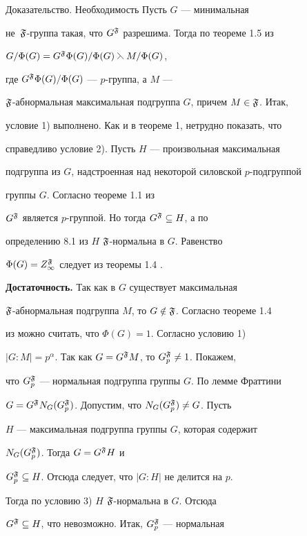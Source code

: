 \begin{pf*}{Доказательство. Необходимость} Пусть $G$ --- минимальная


не~$\frak F$-группа такая, что $G^{\frak F}$ разрешима. Тогда по теореме 1.5 из


\cite{S3} $G/\Phi(G)=G^{\frak F}\Phi(G)/\Phi(G)\leftthreetimes M/\Phi(G)$,


где $G^{\frak F}\Phi(G)/\Phi(G)$ --- $p$-группа, а $M$ ---


$\frak F$-абнормальная максимальная подгруппа $G$, причем $M\in\frak F$. Итак,


условие 1) выполнено. Как и в теореме 1, нетрудно показать, что


справедливо условие 2). Пусть $H$ --- произвольная максимальная


подгруппа из $G$, надстроенная над некоторой силовской $p$-подгруппой


группы $G$. Согласно теореме 1.1 из \cite{S3}


$G^{\frak F}$ является $p$-группой. Но тогда $G^{\frak F}\subseteq H$, а по


определению 8.1 из \cite{S2} $H$\; $\frak F$-нормальна в $G$. Равенство


$\Phi(G)=Z^{\frak F}_\infty$ следует из теоремы 1.4 \cite{S3}.


\smallskip





{\bf Достаточность.} Так как в $G$ существует максимальная


$\frak F$-абнормальная подгруппа $M$, то $G\notin\frak F$. Согласно теореме 1.4


из \cite{S3} можно считать, что $\Phi(G)=1$. Согласно условию 1)


$|G{:}M|=p^\alpha$. Так как $G=G^{\frak F}M$, то $G^{\frak F}_p\ne 1$. Покажем,


что $G^{\frak F}_p$ --- нормальная подгруппа группы $G$. По лемме Фраттини


$G=G^{\frak F}N_G(G^{\frak F}_p)$. Допустим, что $N_G(G^{\frak F}_p)\ne G$. Пусть


$H$ --- максимальная подгруппа группы $G$, которая содержит


$N_G(G^{\frak F}_p)$. Тогда $G=G^{\frak F}H$ и


$G^{\frak F}_p\subseteq H$. Отсюда следует, что $|G{:}H|$ не делится на $p$.


Тогда по условию 3) $H$\; $\frak F$-нормальна в $G$. Отсюда


$G^{\frak F}\subseteq H$, что невозможно. Итак, $G^{\frak F}_p$ --- нормальная



\end{pf*}
